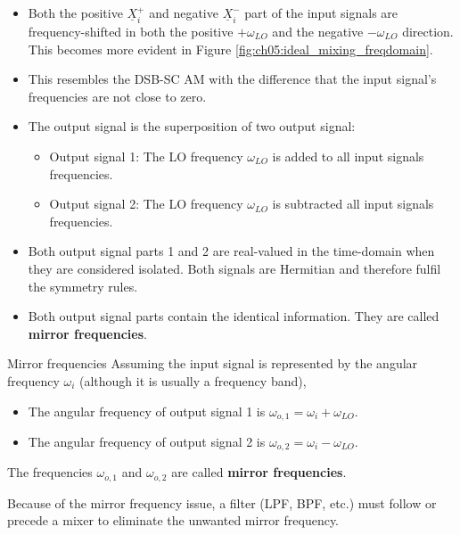 \begin{refsection}
\begin{itemize}
	\item Both the positive $\underline{X}_{i}^{+}$ and negative $\underline{X}_{i}^{-}$ part of the input signals are frequency-shifted in both the positive $+ \omega_{LO}$ and the negative $- \omega_{LO}$ direction. This becomes more evident in Figure \ref{fig:ch05:ideal_mixing_freqdomain}.
	\item This resembles the \ac{DSB-SC} \ac{AM} with the difference that the input signal's frequencies are not close to zero.
	\item The output signal is the superposition of two output signal:
	\begin{itemize}
		\item Output signal 1: The \ac{LO} frequency $\omega_{LO}$ is added to all input signals frequencies.
		\item Output signal 2: The \ac{LO} frequency $\omega_{LO}$ is subtracted all input signals frequencies.
	\end{itemize}
	\item Both output signal parts 1 and 2 are real-valued in the time-domain when they are considered isolated. Both signals are Hermitian and therefore fulfil the symmetry rules.
	\item Both output signal parts contain the identical information. They are called  \textbf{mirror frequencies}.
\end{itemize}

\begin{definition}{Mirror frequencies}
	Assuming the input signal is represented by the angular frequency $\omega_i$ (although it is usually a frequency band),
	\begin{itemize}
		\item The angular frequency of output signal 1 is $\omega_{o,1} = \omega_{i} + \omega_{LO}$.
		\item The angular frequency of output signal 2 is $\omega_{o,2} = \omega_{i} - \omega_{LO}$.
	\end{itemize}

	\vspace{0.5em}

	The frequencies $\omega_{o,1}$ and $\omega_{o,2}$ are called  \textbf{mirror frequencies}.
\end{definition}

\begin{attention}
	Because of the mirror frequency issue, a filter (\ac{LPF}, \ac{BPF}, etc.) must follow or precede a mixer to eliminate the unwanted mirror frequency.
\end{attention}



\end{refsection}
